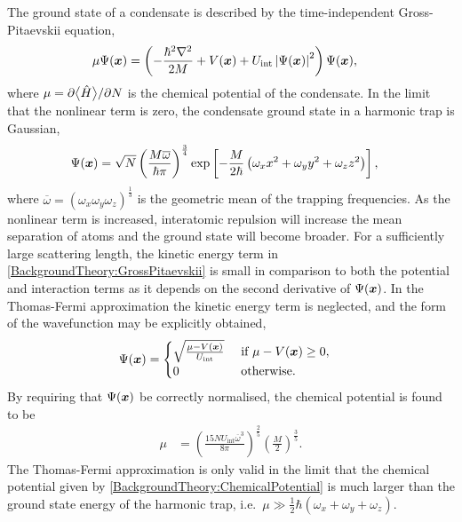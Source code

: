 The ground state of a condensate is described by the time-independent Gross-Pitaevskii equation,
\begin{align}
    \mu \Psi(\bm{x}) &= \left(- \frac{\hbar^2 \nabla^2}{2M} + V(\bm{x}) + U_\text{int} \left|\Psi(\bm{x})\right|^2 \right) \Psi(\bm{x}),
\end{align}
where $\mu = \partial {\ensuremath{\big<\hat{H}\big>}} / \partial N$ is the chemical potential of the condensate.  In the limit that the nonlinear term is zero, the condensate ground state in a harmonic trap is Gaussian,
\begin{align}
    \Psi(\bm{x}) &= \sqrt{N} \left(\frac{M \overline{\omega}}{\hbar \pi} \right)^{\frac{3}{4}} \exp\left[ - \frac{M}{2 \hbar} \left(\omega_x x^2 + \omega_y y^2 + \omega_z z^2\right) \right],
\end{align}
where $\overline{\omega} = \left(\omega_x \omega_y \omega_z\right)^{\frac{1}{3}}$ is the geometric mean of the trapping frequencies.  As the nonlinear term is increased, interatomic repulsion will increase the mean separation of atoms and the ground state will become broader.  For a sufficiently large scattering length, the kinetic energy term in \eqref{BackgroundTheory:GrossPitaevskii} is small in comparison to both the potential and interaction terms as it depends on the second derivative of $\Psi(\bm{x})$.  In the Thomas-Fermi approximation the kinetic energy term is neglected, and the form of the wavefunction may be explicitly obtained,
\begin{align}
    \Psi(\bm{x}) &= 
    \begin{cases}
        \sqrt{\frac{\mu - V(\bm{x})}{U_\text{int}}} &\text{ if } \mu - V(\bm{x}) \geq 0,\\
        0 & \text{ otherwise.}
    \end{cases}
\end{align}
By requiring that $\Psi(\bm{x})$ be correctly normalised, the chemical potential is found to be
\begin{align}
    \mu &= \left(\frac{15 N U_\text{int} \overline{\omega}^3}{8 \pi} \right)^{\frac{2}{5}} \left(\frac{M}{2} \right)^{\frac{3}{5}}. \label{BackgroundTheory:ChemicalPotential}
\end{align}
The Thomas-Fermi approximation is only valid in the limit that the chemical potential given by \eqref{BackgroundTheory:ChemicalPotential} is much larger than the ground state energy of the harmonic trap, i.e.\ $\mu \gg \frac{1}{2} \hbar (\omega_x + \omega_y + \omega_z)$.


